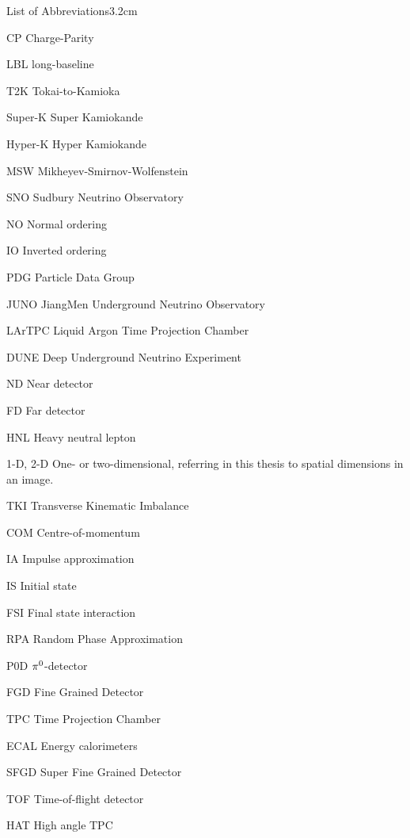 \begin{mclistof}{List of Abbreviations}{3.2cm}

\item[CP] Charge-Parity
\item[LBL] long-baseline
\item[T2K] Tokai-to-Kamioka
\item[Super-K] Super Kamiokande
\item[Hyper-K] Hyper Kamiokande

\item[MSW] Mikheyev-Smirnov-Wolfenstein

\item[SNO] Sudbury Neutrino Observatory

\item[NO] Normal ordering
\item[IO] Inverted ordering

\item[PDG] Particle Data Group

\item[JUNO] JiangMen Underground Neutrino Observatory
\item[LArTPC] Liquid Argon Time Projection Chamber 
\item[DUNE] Deep Underground Neutrino Experiment 

\item[ND] Near detector
\item[FD] Far detector

\item[HNL] Heavy neutral lepton 

\item[1-D, 2-D] One- or two-dimensional, referring in this thesis to spatial dimensions in an image.

\item[TKI] Transverse Kinematic Imbalance
\item[COM] Centre-of-momentum

\item[IA] Impulse approximation 
\item[IS] Initial state
\item[FSI] Final state interaction
\item[RPA] Random Phase Approximation

\item[P0D] $\pi^0$-detector
\item[FGD] Fine Grained Detector
\item[TPC] Time Projection Chamber
\item[ECAL] Energy calorimeters 
\item[SFGD] Super Fine Grained Detector
\item[TOF] Time-of-flight detector
\item[HAT] High angle TPC


\end{mclistof}
